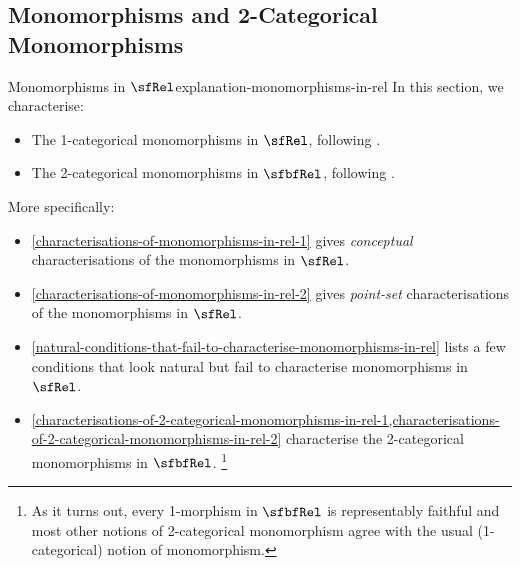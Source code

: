 \subsection{Monomorphisms and 2-Categorical Monomorphisms}\label{subsection-monomorphisms-and-2-categorical-monomorphisms}
\begin{explanation}{Monomorphisms in $\sfRel$}{explanation-monomorphisms-in-rel}%
    In this section, we characterise:
    \begin{itemize}
        \item The 1-categorical monomorphisms in $\sfRel$, following .
        \item The 2-categorical monomorphisms in $\sfbfRel$, following .
    \end{itemize}
    More specifically:
    \begin{itemize}
        \item \cref{characterisations-of-monomorphisms-in-rel-1}             gives \emph{conceptual} characterisations of the                                           monomorphisms in $\sfRel$.
        \item \cref{characterisations-of-monomorphisms-in-rel-2}             gives \emph{point-set}  characterisations of the                                           monomorphisms in $\sfRel$.
        \item \cref{natural-conditions-that-fail-to-characterise-monomorphisms-in-rel} lists a few conditions that look natural but fail to characterise                monomorphisms in $\sfRel$.
        \item \cref{characterisations-of-2-categorical-monomorphisms-in-rel-1,characterisations-of-2-categorical-monomorphisms-in-rel-2} characterise the 2-categorical monomorphisms in $\sfbfRel$.%
            \footnote{%
                As it turns out, every 1-morphism in $\sfbfRel$ is representably faithful and most other notions of 2-categorical monomorphism agree with the usual (1-categorical) notion of monomorphism.
                \par\vspace*{\TCBBoxCorrection}
            }%
    \end{itemize}

\end{explanation}

